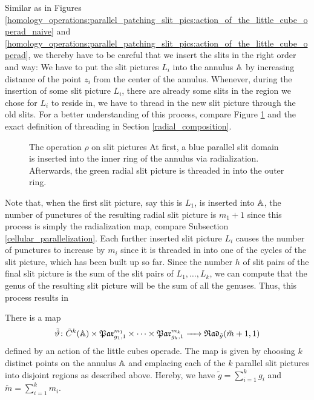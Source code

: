 Similar as in Figures \ref{homology_operations:parallel_patching_slit_pics:action_of_the_little_cube_operad_naive} and \ref{homology_operations:parallel_patching_slit_pics:action_of_the_little_cube_operad},
we thereby have to be careful that we insert the slits in the right order and way:
We have to put the slit pictures $L_i$ into the annulus $\mathbb A$ by increasing distance of the point $z_i$ from the center of the annulus. 
Whenever, during the insertion of some slit picture $L_i$, there are already some slits in the region we chose for $L_i$ to reside in,
we have to thread in the new slit picture through the old slits.
For a better understanding of this process, compare Figure \ref{radial_threading} and the exact definition of threading in Section \ref{radial_composition}.

\begin{figure}[ht]
  \centering
  \caption{\label{radial_threading} The operation $\rho$ on slit pictures At first, a blue parallel slit domain is inserted into the inner ring of the annulus via radialization. 
                                    Afterwards, the green radial slit picture is threaded in into the outer ring.}
\end{figure}

Note that, when the first slit picture, say this is $L_1$, is inserted into $\mathbb A$, the number of punctures of the resulting radial slit picture is $m_1 + 1$
since this process is simply the radialization map, compare Subsection \ref{cellular_parallelization}.
Each further inserted slit picture $L_i$ causes the number of punctures to increase by $m_i$ since it is threaded in into one of the cycles of the slit picture, which has been built up so far.
Since the number $h$ of slit pairs of the final slit picture is the sum of the slit pairs of $L_1, \dotsc, L_k$, 
we can compute that the genus of the resulting slit picture will be the sum of all the genuses.
Thus, this process results in

\begin{prop}
\label{little_cubes_radial}
   There is a map 
   \[
      \tilde \vartheta \colon \tilde C^k(\mathbb A) \times \mathfrak{Par}_{g_1, 1}^{m_1} \times \dotsb \times \mathfrak{Par}_{g_k, 1}^{m_k} \xrightarrow{\hspace{6pt}{}\hspace{6pt}} \mathfrak{Rad}_{\tilde g}(\tilde m + 1, 1) 
   \]
   defined by an action of the little cubes operade.
   The map is given by choosing $k$ distinct points on the annulus $\mathbb A$ and emplacing each of the $k$ parallel slit pictures into disjoint regions as described above.
   Hereby, we have $\tilde g = \sum_{i = 1}^k g_i$ and $\tilde m = \sum_{i = 1}^k m_i$.
\end{prop}

